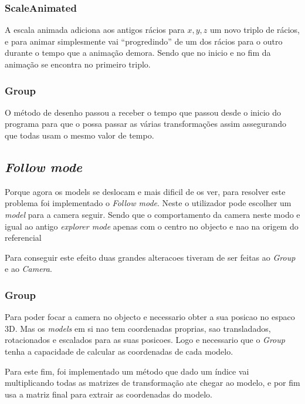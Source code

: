 \documentclass[a4paper]{article}
\begin{document}
\subsubsection{ScaleAnimated}

A escala animada adiciona aos antigos rácios para $x, y, z$ um novo triplo de rácios, e para animar simplesmente vai ``progredindo'' de um dos rácios para o outro durante o tempo que a animação demora. Sendo que no inicio e no fim da animação se encontra no primeiro triplo.

\subsubsection{Group}

O método de desenho passou a receber o tempo que passou desde o inicio do programa para que o possa passar as várias transformações assim assegurando que todas usam o mesmo valor de tempo.

\subsection{\textit{Follow mode}}
Porque agora os models se deslocam e mais dificil de os ver, para resolver este problema
foi implementado o \textit{Follow mode}. Neste o utilizador pode escolher um \textit{model}
para a camera seguir. Sendo que o comportamento da camera neste modo e igual ao antigo
\textit{explorer mode} apenas com o centro no objecto e nao na origem do referencial

Para conseguir este efeito duas grandes alteracoes tiveram de ser feitas ao \textit{Group} e ao
\textit{Camera}.

\subsubsection{Group}

Para poder focar a camera no objecto e necessario obter a sua posicao no espaco 3D. Mas os
\textit{models} em si nao tem coordenadas proprias, sao transladados, rotacionados e escalados para as suas posicoes. Logo e necessario que o \textit{Group} tenha a capacidade de calcular as coordenadas de cada modelo.

Para este fim, foi implementado um método que dado um índice vai multiplicando todas as matrizes de transformação ate chegar ao modelo, e por fim usa a matriz final para extrair as coordenadas do modelo.

\end{document}

